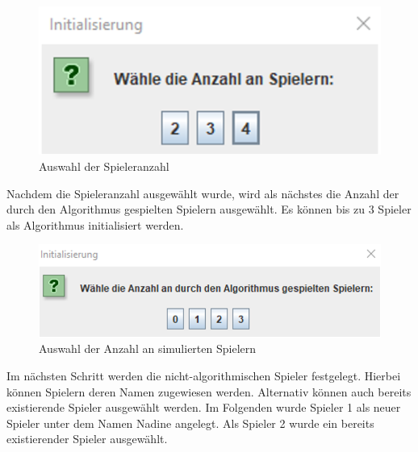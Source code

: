 \begin{figure}[htbp]
\centering
\centerline{\includegraphics[scale=.5]{anleitung1}}
\caption{Auswahl der Spieleranzahl}
\label{fig:anleitung1}
\end{figure}

\noindent Nachdem die Spieleranzahl ausgewählt wurde, wird als nächstes die Anzahl der durch den Algorithmus gespielten Spielern ausgewählt. Es können bis zu 3 Spieler als Algorithmus initialisiert werden.

\begin{figure}[htbp]
\centering
\centerline{\includegraphics[scale=.5]{anleitung2}}
\caption{Auswahl der Anzahl an simulierten Spielern}
\label{fig:anleitung2}
\end{figure}

\noindent Im nächsten Schritt werden die nicht-algorithmischen Spieler festgelegt. Hierbei können Spielern deren Namen zugewiesen werden. Alternativ können auch bereits existierende Spieler ausgewählt werden. Im Folgenden wurde Spieler 1 als neuer Spieler unter dem Namen Nadine angelegt. Als Spieler 2 wurde ein bereits existierender Spieler ausgewählt.

\newpage



